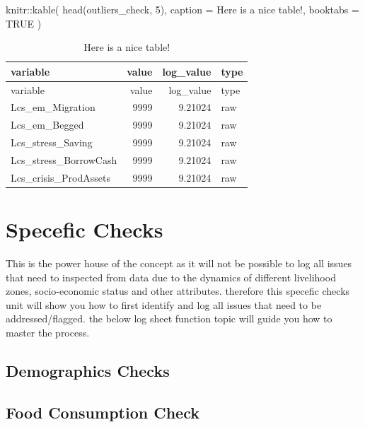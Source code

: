\documentclass[
  letterpaper,
  DIV=11,
  numbers=noendperiod]{scrreprt}
\newenvironment{Shaded}{\begin{snugshade}}{\end{snugshade}}
\newcommand{\AttributeTok}[1]{\textcolor[rgb]{0.40,0.45,0.13}{#1}}
\newcommand{\ConstantTok}[1]{\textcolor[rgb]{0.56,0.35,0.01}{#1}}
\newcommand{\DecValTok}[1]{\textcolor[rgb]{0.68,0.00,0.00}{#1}}
\newcommand{\FunctionTok}[1]{\textcolor[rgb]{0.28,0.35,0.67}{#1}}
\newcommand{\NormalTok}[1]{\textcolor[rgb]{0.00,0.23,0.31}{#1}}
\newcommand{\SpecialCharTok}[1]{\textcolor[rgb]{0.37,0.37,0.37}{#1}}
\newcommand{\StringTok}[1]{\textcolor[rgb]{0.13,0.47,0.30}{#1}}
\begin{document}
\begin{Shaded}
\begin{Highlighting}[]
\NormalTok{knitr}\SpecialCharTok{::}\FunctionTok{kable}\NormalTok{(}
  \FunctionTok{head}\NormalTok{(outliers\_check, }\DecValTok{5}\NormalTok{), }\AttributeTok{caption =} \StringTok{\textquotesingle{}Here is a nice table!\textquotesingle{}}\NormalTok{,}
  \AttributeTok{booktabs =} \ConstantTok{TRUE}
\NormalTok{)}
\end{Highlighting}
\end{Shaded}

\begin{longtable}[]{@{}lrrl@{}}
\caption{Here is a nice table!}\tabularnewline
\toprule\noalign{}
variable & value & log\_value & type \\
\midrule\noalign{}
\endfirsthead
\toprule\noalign{}
variable & value & log\_value & type \\
\midrule\noalign{}
\endhead
\bottomrule\noalign{}
\endlastfoot
Lcs\_em\_Migration & 9999 & 9.21024 & raw \\
Lcs\_em\_Begged & 9999 & 9.21024 & raw \\
Lcs\_stress\_Saving & 9999 & 9.21024 & raw \\
Lcs\_stress\_BorrowCash & 9999 & 9.21024 & raw \\
Lcs\_crisis\_ProdAssets & 9999 & 9.21024 & raw \\
\end{longtable}

\section{Specefic Checks}\label{specefic-checks}

This is the power house of the concept as it will not be possible to log
all issues that need to inspected from data due to the dynamics of
different livelihood zones, socio-economic status and other attributes.
therefore this specefic checks unit will show you how to first identify
and log all issues that need to be addressed/flagged. the below log
sheet function topic will guide you how to master the process.

\subsection{Demographics Checks}\label{demographics-checks}

\subsection{Food Consumption Check}\label{food-consumption-check}
\end{document}
